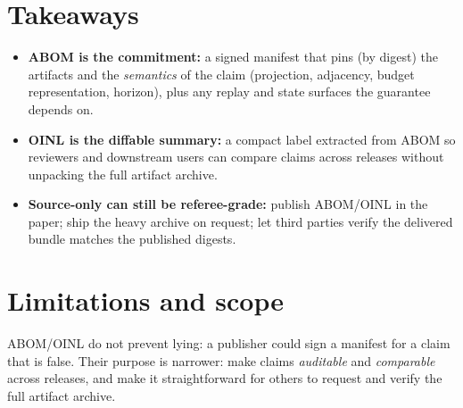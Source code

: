 \documentclass[11pt]{article}
\begin{document}
\section{Takeaways}
\begin{itemize}[leftmargin=*]
\item \textbf{ABOM is the commitment:} a signed manifest that pins (by digest) the artifacts and the \emph{semantics} of the claim (projection, adjacency, budget representation, horizon), plus any replay and state surfaces the guarantee depends on.
\item \textbf{OINL is the diffable summary:} a compact label extracted from ABOM so reviewers and downstream users can compare claims across releases without unpacking the full artifact archive.
\item \textbf{Source-only can still be referee-grade:} publish ABOM/OINL in the paper; ship the heavy archive on request; let third parties verify the delivered bundle matches the published digests.
\end{itemize}

\section{Limitations and scope}
ABOM/OINL do not prevent lying: a publisher could sign a manifest for a claim that is false.
Their purpose is narrower: make claims \emph{auditable} and \emph{comparable} across releases, and make it straightforward for others to request and verify the full artifact archive.
\end{document}
